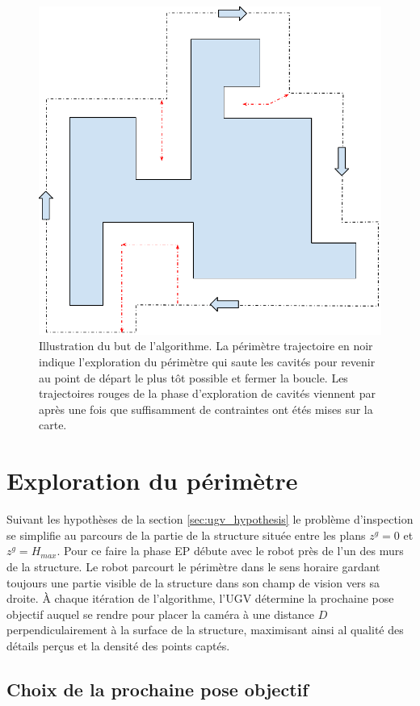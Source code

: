 \begin{figure}[ht]
  \centering
  \includegraphics[width=0.5\linewidth]{images/ugv_goal}
  \caption{Illustration du but de l'algorithme. La périmètre trajectoire en noir indique l'exploration du périmètre qui saute les cavités pour revenir au point de départ le plus tôt possible et fermer la boucle. Les trajectoires rouges de la phase d'exploration de cavités viennent par après une fois que suffisamment de contraintes ont étés mises sur la carte.}
  \label{fig:ugv_overview}
\end{figure}

\section{Exploration du périmètre} \label{sec:perimeter_exploration}

Suivant les hypothèses de la section \ref{sec:ugv_hypothesis} le problème d'inspection se simplifie au parcours de la partie de la structure située entre les plans $z^g = 0$ et $z^g = H_{max}$. Pour ce faire la phase EP débute avec le robot près de l'un des murs de la structure. Le robot parcourt le périmètre dans le sens horaire gardant toujours une partie visible de la structure dans son champ de vision vers sa droite. À chaque itération de l'algorithme, l'UGV détermine la prochaine pose objectif auquel se rendre pour placer la caméra à une distance $D$ perpendiculairement à la surface de la structure, maximisant ainsi al qualité des détails perçus et la densité des points captés.

\subsection{Choix de la prochaine pose objectif}

